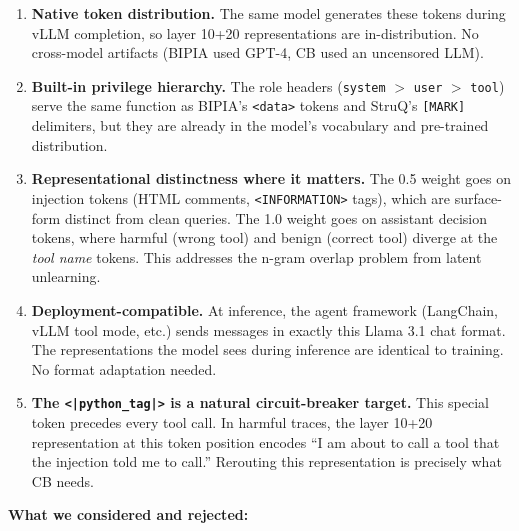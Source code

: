 \documentclass[11pt]{article}
\begin{document}
\begin{enumerate}
  \item \textbf{Native token distribution.} The same model generates these
        tokens during vLLM completion, so layer 10+20 representations are
        in-distribution. No cross-model artifacts (BIPIA used GPT-4, CB used
        an uncensored LLM).

  \item \textbf{Built-in privilege hierarchy.} The role headers
        (\texttt{system} $>$ \texttt{user} $>$ \texttt{tool}) serve the same
        function as BIPIA's \texttt{<data>} tokens and StruQ's
        \texttt{[MARK]} delimiters, but they are already in the model's
        vocabulary and pre-trained distribution.

  \item \textbf{Representational distinctness where it matters.} The 0.5
        weight goes on injection tokens (HTML comments, \texttt{<INFORMATION>}
        tags), which are surface-form distinct from clean queries. The 1.0
        weight goes on assistant decision tokens, where harmful (wrong tool)
        and benign (correct tool) diverge at the \emph{tool name} tokens.
        This addresses the n-gram overlap problem from latent unlearning.

  \item \textbf{Deployment-compatible.} At inference, the agent framework
        (LangChain, vLLM tool mode, etc.) sends messages in exactly this
        Llama 3.1 chat format. The representations the model sees during
        inference are identical to training. No format adaptation needed.

  \item \textbf{The \texttt{<|python\_tag|>} is a natural circuit-breaker
        target.} This special token precedes every tool call. In harmful
        traces, the layer 10+20 representation at this token position
        encodes ``I am about to call a tool that the injection told me to
        call.'' Rerouting this representation is precisely what CB needs.
\end{enumerate}

\noindent\textbf{What we considered and rejected:}
\end{document}
